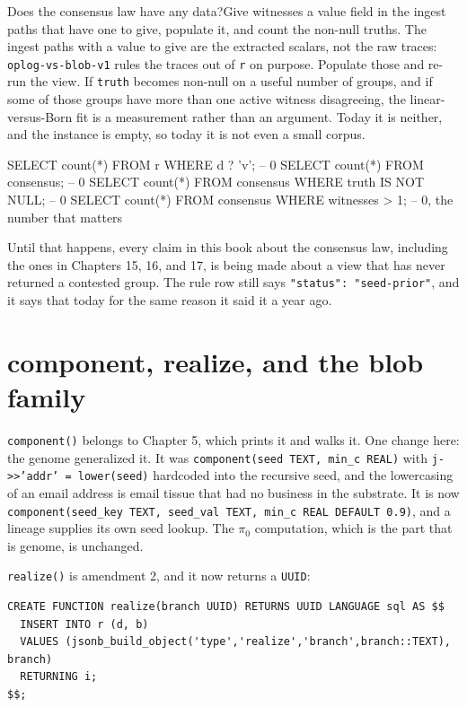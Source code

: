 \begin{Open}{Does the consensus law have any data?}{Give witnesses a value field in the ingest paths that have one to give, populate it, and count the non-null truths.}
The ingest paths with a value to give are the extracted scalars, not the raw traces: \texttt{oplog-vs-blob-v1} rules the traces out of \texttt{r} on purpose. Populate those and re-run the view. If \texttt{truth} becomes non-null on a useful number of groups, and if some of those groups have more than one active witness disagreeing, the linear-versus-Born fit is a measurement rather than an argument. Today it is neither, and the instance is empty, so today it is not even a small corpus.
\begin{Check}
SELECT count(*) FROM r WHERE d ? 'v';                    -- 0
SELECT count(*) FROM consensus;                          -- 0
SELECT count(*) FROM consensus WHERE truth IS NOT NULL;  -- 0
SELECT count(*) FROM consensus WHERE witnesses > 1;      -- 0, the number that matters
\end{Check}
Until that happens, every claim in this book about the consensus law, including the ones in Chapters 15, 16, and 17, is being made about a view that has never returned a contested group. The rule row still says \texttt{"status": "seed-prior"}, and it says that today for the same reason it said it a year ago.
\end{Open}

\section{component, realize, and the blob family}

\texttt{component()} belongs to Chapter 5, which prints it and walks it. One change here: the genome generalized it. It was \texttt{component(seed TEXT, min\_c REAL)} with \texttt{j->>'addr' = lower(seed)} hardcoded into the recursive seed, and the lowercasing of an email address is email tissue that had no business in the substrate. It is now \texttt{component(seed\_key TEXT, seed\_val TEXT, min\_c REAL DEFAULT 0.9)}, and a lineage supplies its own seed lookup. The $\pi_0$ computation, which is the part that is genome, is unchanged.

\texttt{realize()} is amendment 2, and it now returns a \texttt{UUID}:

\begin{verbatim}
CREATE FUNCTION realize(branch UUID) RETURNS UUID LANGUAGE sql AS $$
  INSERT INTO r (d, b)
  VALUES (jsonb_build_object('type','realize','branch',branch::TEXT), branch)
  RETURNING i;
$$;
\end{verbatim}

